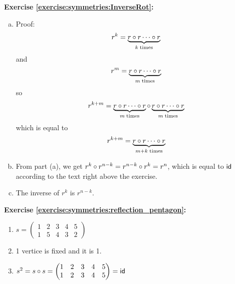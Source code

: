 \noindent\textbf{Exercise \ref{exercise:symmetries:InverseRot}:}
\begin{enumerate}[(a)]
\item
Proof:
\[
r^k =  \underbrace{r \circ r \cdots \circ r}_{k \; {\rm times}}
\]
and
\[
r^m =  \underbrace{r \circ r \cdots \circ r}_{m \; {\rm times}}
\]
so
\[
r^{k+m} =  \underbrace{r \circ r \cdots \circ r}_{m \; {\rm times}} \circ 
\underbrace{r \circ r \cdots \circ r}_{m \; {\rm times}}
\]
which is equal to
\[
r^{k+m} =  \underbrace{r \circ r \cdots \circ r}_{m+k \; {\rm times}}
\]

\item
From part (a), we get  $r^k \circ r^{n-k} = r^{n-k} \circ r^k = r^n$, which is equal to ${\sf{i}d}$ according to the text right above the exercise.

\item
The inverse of $r^k$ is $r^{n-k}$.
\end{enumerate}

\noindent\textbf{Exercise \ref{exercise:symmetries:reflection_pentagon}:}
\begin{enumerate}[{a.}]
\item
$s =\begin{pmatrix}
	1 & 2 & 3 & 4 & 5\\
	1 & 5 & 4 & 3 & 2
	\end{pmatrix}$
	
\item
1 vertice is fixed and it is 1.

\item
$s^2 = s \circ s =\begin{pmatrix}
	1 & 2 & 3 & 4 & 5\\
	1 & 2 & 3 & 4 & 5
	\end{pmatrix} = \sf{id}$
\end{enumerate}


